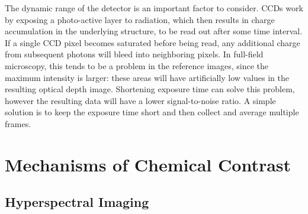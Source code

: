 \documentclass[journal=cmatex,manuscript=perspective]{achemso}
\begin{document}
The dynamic range of the detector is an important factor to
consider. CCDs work by exposing a photo-active layer to radiation,
which then results in charge accumulation in the underlying structure,
to be read out after some time interval. If a single CCD pixel becomes
saturated before being read, any additional charge from subsequent
photons will bleed into neighboring pixels. In full-field microscopy,
this tends to be a problem in the reference images, since the maximum
intensity is larger: these areas will have artificially low values in
the resulting optical depth image. Shortening exposure time can solve
this problem, however the resulting data will have a lower
signal-to-noise ratio. A simple solution is to keep the exposure time
short and then collect and average multiple frames.

\section{Mechanisms of Chemical Contrast}

\subsection{Hyperspectral Imaging}
\end{document}
